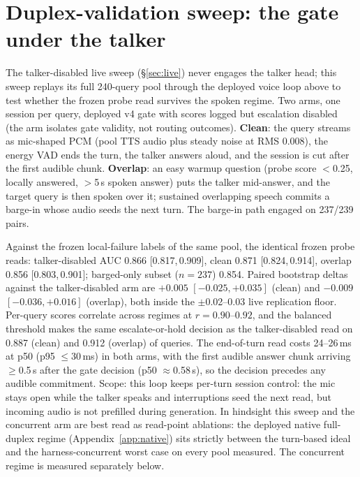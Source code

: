 \section{Duplex-validation sweep: the gate under the talker}
\label{app:duplexval}

The talker-disabled live sweep (\S\ref{sec:live}) never engages the talker
head; this sweep replays its full 240-query pool through the deployed
voice loop above to test whether the frozen probe read survives the
spoken regime. Two arms, one session per query, deployed v4 gate with
scores logged but escalation disabled (the arm isolates gate validity,
not routing outcomes). \textbf{Clean}: the query streams as
mic-shaped PCM (pool TTS audio plus steady noise at RMS 0.008), the
energy VAD ends the turn, the talker answers aloud, and the session is
cut after the first audible chunk. \textbf{Overlap}: an easy warmup
question (probe score $<$0.25, locally answered, $>$5\,s spoken answer)
puts the talker mid-answer, and the target query is then spoken over
it; sustained overlapping speech commits a barge-in whose audio seeds
the next turn. The barge-in path engaged on 237/239 pairs.

Against the frozen local-failure labels of the same pool, the
identical frozen probe reads: talker-disabled AUC 0.866 [0.817,\,0.909], clean
0.871 [0.824,\,0.914], overlap 0.856 [0.803,\,0.901]; barged-only subset
($n{=}237$) 0.854. Paired bootstrap deltas against the talker-disabled arm are $+0.005$
$[-0.025,+0.035]$ (clean) and $-0.009$ $[-0.036,+0.016]$ (overlap), both
inside the $\pm$0.02--0.03 live replication floor. Per-query scores
correlate across regimes at $r{=}0.90$--$0.92$, and the balanced
threshold makes the same escalate-or-hold decision as the talker-disabled read on
0.887 (clean) and 0.912 (overlap) of queries. The end-of-turn read costs
24--26\,ms at p50 (p95 $\le$30\,ms) in both arms, with the first
audible answer chunk arriving $\ge$0.5\,s after the gate decision
(p50 $\approx$0.58\,s), so the decision precedes any audible
commitment. Scope: this loop keeps per-turn session control: the mic
stays open while the talker speaks and interruptions seed the next
read, but incoming audio is not prefilled during generation.
In hindsight this sweep and the concurrent arm are best read as
read-point ablations: the deployed native full-duplex regime
(Appendix~\ref{app:native}) sits strictly between the turn-based
ideal and the harness-concurrent worst case on every pool measured.
The concurrent regime is measured separately below.

